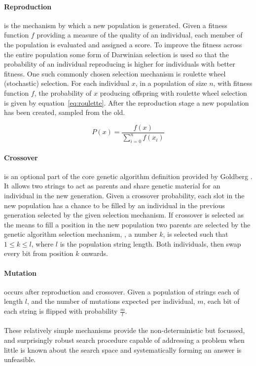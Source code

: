 \paragraph{Reproduction}
is the mechanism by which a new population is generated. Given a fitness function
$f$ providing a measure of the quality of an individual, each member of the
population is evaluated and
assigned a score. To improve the fitness across the entire population some form
of Darwinian selection is used so that the probability of an individual
reproducing is higher for individuals with better fitness.
One such commonly chosen selection mechanism is roulette wheel (stochastic) selection.
For each individual $x$, in a population of size $n$, with fitness function $f$,
the probability of $x$ producing offspring with roulette wheel
selection is given by equation~\ref{eq:roulette}. After the reproduction
stage a new population has been created, sampled from the old.

\begin{equation}
	P(x) = \frac{f(x)}{\sum_{i=0}^{n}f(x_{i})}
	\label{eq:roulette}
\end{equation}

\paragraph{Crossover} is an optional part of the core genetic algorithm definition
provided by Goldberg \cite{Goldberg:1989:GAS:534133}. It
allows two strings to act as parents and share genetic material for an individual
in the new generation. Given a crossover probability, each slot in the new population
has a chance to be filled by an individual in the previous generation selected
by the given selection mechanism. If crossover is selected as the means to
fill a position in the new population two parents are selected by the genetic
algorithm selection mechanism,
, a number $k$,
is selected such that $1 \leq k \leq l$, where $l$ is the population string length.
Both individuals, then swap every bit from position $k$ onwards.

\paragraph{Mutation}
occurs after reproduction and crossover. Given a population of strings each of length
$l$, and the number of mutations expected per individual, $m$, each bit of each string
is flipped with probability $\frac{m}{l}$.

\paragraph{}
These relatively simple mechanisms provide the non-deterministic but focussed,
and surprisingly robust search procedure capable of addressing a problem when
little is known about the search space and systematically forming an answer is
unfeasible.

